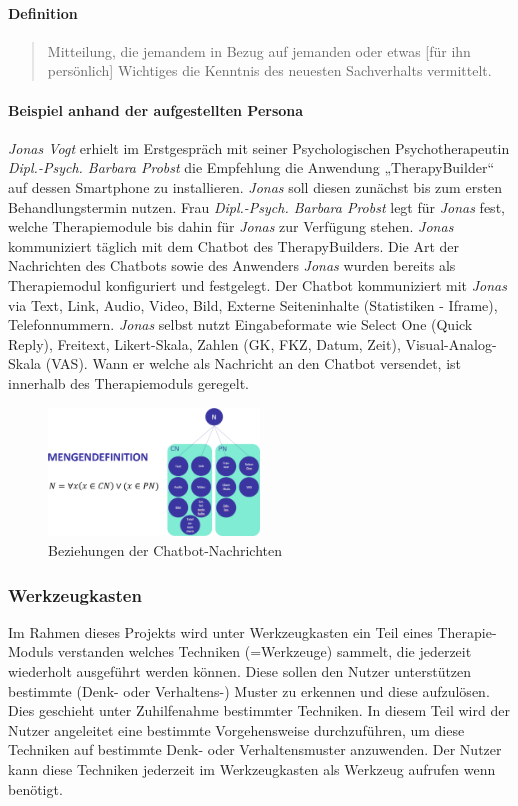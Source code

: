 \paragraph{Definition}
\begin{quote}
Mitteilung, die jemandem in Bezug auf jemanden oder etwas [für ihn persönlich] Wichtiges die Kenntnis des neuesten Sachverhalts vermittelt. \cite{DudenNac9:online}
\end{quote}

\paragraph{Beispiel anhand der aufgestellten Persona}
\emph{Jonas Vogt} erhielt im Erstgespräch mit seiner Psychologischen Psychotherapeutin \emph{Dipl.-Psych. Barbara Probst} die Empfehlung die Anwendung „TherapyBuilder“ auf dessen Smartphone zu installieren. \emph{Jonas} soll diesen zunächst bis zum ersten Behandlungstermin nutzen. Frau \emph{Dipl.-Psych. Barbara Probst} legt für \emph{Jonas} fest, welche Therapiemodule bis dahin für \emph{Jonas} zur Verfügung stehen. \emph{Jonas} kommuniziert täglich mit dem Chatbot des TherapyBuilders. Die Art der Nachrichten des Chatbots sowie des Anwenders \emph{Jonas} wurden bereits als Therapiemodul konfiguriert und festgelegt. Der Chatbot kommuniziert mit \emph{Jonas} via Text, Link, Audio, Video, Bild, Externe Seiteninhalte (Statistiken - Iframe), Telefonnummern. \emph{Jonas} selbst nutzt Eingabeformate wie Select One (Quick Reply), Freitext, Likert-Skala, Zahlen (GK, FKZ, Datum, Zeit), Visual-Analog-Skala (VAS). Wann er welche als Nachricht an den Chatbot versendet, ist innerhalb des Therapiemoduls geregelt.

\begin{figure}[h]
\centering
\includegraphics[width=0.5\textwidth]{pictures/nachrichtdef}
\caption{Beziehungen der Chatbot-Nachrichten}
\label{therapiedef}
\end{figure}

\subsubsection{Werkzeugkasten}
Im Rahmen dieses Projekts wird unter Werkzeugkasten ein Teil eines Therapie-Moduls verstanden welches Techniken (=Werkzeuge) sammelt, die jederzeit wiederholt ausgeführt werden können. Diese sollen den Nutzer unterstützen bestimmte (Denk- oder Verhaltens-) Muster zu erkennen und diese aufzulösen. Dies geschieht unter Zuhilfenahme bestimmter Techniken. In diesem Teil wird der Nutzer angeleitet eine bestimmte Vorgehensweise durchzuführen, um diese Techniken auf bestimmte Denk- oder Verhaltensmuster anzuwenden. Der Nutzer kann diese Techniken jederzeit im Werkzeugkasten als Werkzeug aufrufen wenn benötigt.

